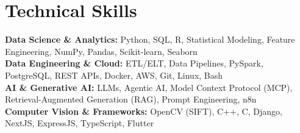 \medskip

\resumeItemListStart
{}
\resumeItemListEnd
\resumeItemListEnd

\resumeSubHeadingListEnd

\section{Technical Skills}
\begin{itemize}[leftmargin=0.15in, label={}]
  \small{\item{
        \textbf{Data Science \& Analytics:} {Python, SQL, R, Statistical Modeling, Feature Engineering, NumPy, Pandas, Scikit-learn, Seaborn} \\
        \textbf{Data Engineering \& Cloud:} {ETL/ELT, Data Pipelines, PySpark, PostgreSQL, REST APIs, Docker, AWS, Git, Linux, Bash} \\
        \textbf{AI \& Generative AI:} {LLMs, Agentic AI, Model Context Protocol (MCP), Retrieval-Augmented Generation (RAG), Prompt Engineering, n8n} \\
        \textbf{Computer Vision \& Frameworks:} {OpenCV (SIFT), C++, C, Django, NextJS, ExpressJS, TypeScript, Flutter}
        }}
\end{itemize}

